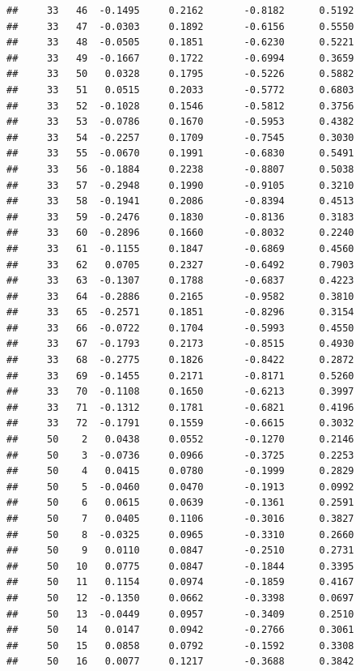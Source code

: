 \documentclass[
]{article}
\begin{document}
\begin{verbatim}
##     33   46  -0.1495     0.2162       -0.8182      0.5192  
##     33   47  -0.0303     0.1892       -0.6156      0.5550  
##     33   48  -0.0505     0.1851       -0.6230      0.5221  
##     33   49  -0.1667     0.1722       -0.6994      0.3659  
##     33   50   0.0328     0.1795       -0.5226      0.5882  
##     33   51   0.0515     0.2033       -0.5772      0.6803  
##     33   52  -0.1028     0.1546       -0.5812      0.3756  
##     33   53  -0.0786     0.1670       -0.5953      0.4382  
##     33   54  -0.2257     0.1709       -0.7545      0.3030  
##     33   55  -0.0670     0.1991       -0.6830      0.5491  
##     33   56  -0.1884     0.2238       -0.8807      0.5038  
##     33   57  -0.2948     0.1990       -0.9105      0.3210  
##     33   58  -0.1941     0.2086       -0.8394      0.4513  
##     33   59  -0.2476     0.1830       -0.8136      0.3183  
##     33   60  -0.2896     0.1660       -0.8032      0.2240  
##     33   61  -0.1155     0.1847       -0.6869      0.4560  
##     33   62   0.0705     0.2327       -0.6492      0.7903  
##     33   63  -0.1307     0.1788       -0.6837      0.4223  
##     33   64  -0.2886     0.2165       -0.9582      0.3810  
##     33   65  -0.2571     0.1851       -0.8296      0.3154  
##     33   66  -0.0722     0.1704       -0.5993      0.4550  
##     33   67  -0.1793     0.2173       -0.8515      0.4930  
##     33   68  -0.2775     0.1826       -0.8422      0.2872  
##     33   69  -0.1455     0.2171       -0.8171      0.5260  
##     33   70  -0.1108     0.1650       -0.6213      0.3997  
##     33   71  -0.1312     0.1781       -0.6821      0.4196  
##     33   72  -0.1791     0.1559       -0.6615      0.3032  
##     50    2   0.0438     0.0552       -0.1270      0.2146  
##     50    3  -0.0736     0.0966       -0.3725      0.2253  
##     50    4   0.0415     0.0780       -0.1999      0.2829  
##     50    5  -0.0460     0.0470       -0.1913      0.0992  
##     50    6   0.0615     0.0639       -0.1361      0.2591  
##     50    7   0.0405     0.1106       -0.3016      0.3827  
##     50    8  -0.0325     0.0965       -0.3310      0.2660  
##     50    9   0.0110     0.0847       -0.2510      0.2731  
##     50   10   0.0775     0.0847       -0.1844      0.3395  
##     50   11   0.1154     0.0974       -0.1859      0.4167  
##     50   12  -0.1350     0.0662       -0.3398      0.0697  
##     50   13  -0.0449     0.0957       -0.3409      0.2510  
##     50   14   0.0147     0.0942       -0.2766      0.3061  
##     50   15   0.0858     0.0792       -0.1592      0.3308  
##     50   16   0.0077     0.1217       -0.3688      0.3842  

\end{verbatim}
\end{document}
